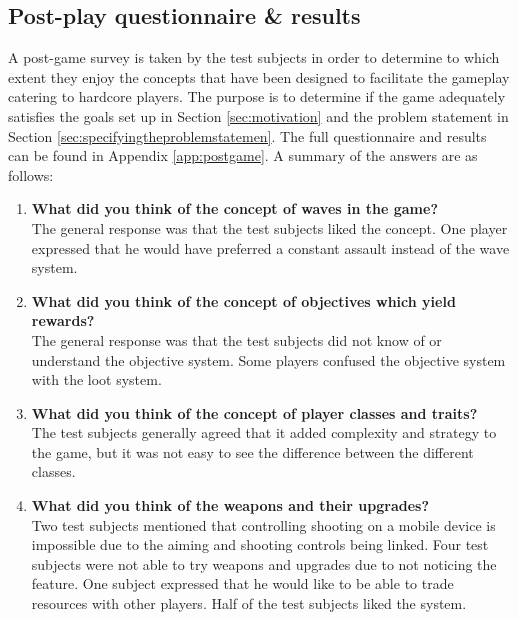 \subsection{Post-play questionnaire \& results}\label{test:results}
A post-game survey is taken by the test subjects in order to determine to which extent they enjoy the concepts that have been designed to facilitate the gameplay catering to hardcore players.
The purpose is to determine if the game adequately satisfies the goals set up in Section \ref{sec:motivation} and the problem statement in Section \ref{sec:specifyingtheproblemstatemen}.
The full questionnaire and results can be found in Appendix \ref{app:postgame}.
A summary of the answers are as follows:
\begin{enumerate}\label{test:post-play}
\item \textbf{What did you think of the concept of waves in the game?}\vspace{4pt}\\
The general response was that the test subjects liked the concept.
One player expressed that he would have preferred a constant assault instead of the wave system.

\item \textbf{What did you think of the concept of objectives which yield rewards?}\vspace{4pt}\\
The general response was that the test subjects did not know of or understand the objective system.
Some players confused the objective system with the loot system.

\item \textbf{What did you think of the concept of player classes and traits?}\vspace{4pt}\\
The test subjects generally agreed that it added complexity and strategy to the game, but it was not easy to see the difference between the different classes.

\item \textbf{What did you think of the weapons and their upgrades?}\vspace{4pt}\\
Two test subjects mentioned that controlling shooting on a mobile device is impossible due to the aiming and shooting controls being linked.
Four test subjects were not able to try weapons and upgrades due to not noticing the feature.
One subject expressed that he would like to be able to trade resources with other players.
Half of the test subjects liked the system.


\end{enumerate}
